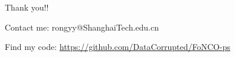 \documentclass[8pt]{beamer}
\begin{document}
\begin{frame}[c]{ }

\centerline{\red Thank you!!}

\vspace{3em}

\centerline{\red  Contact me: rongyy@ShanghaiTech.edu.cn}

\vspace{3em}





\centerline{\red Find my code: \underline  {  https://github.com/DataCorrupted/FoNCO-ps}}



\end{frame}

 
\end{document}
